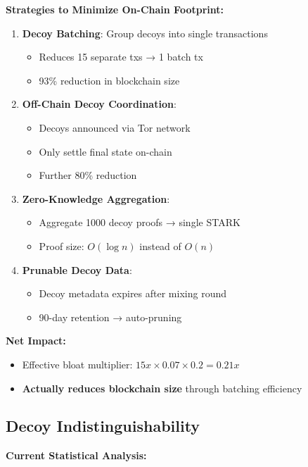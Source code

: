 \documentclass[12pt,a4paper]{article}
\begin{document}
\textbf{Strategies to Minimize On-Chain Footprint:}

\begin{enumerate}
\item \textbf{Decoy Batching}: Group decoys into single transactions
\begin{itemize}
\item Reduces 15 separate txs → 1 batch tx
\item 93\% reduction in blockchain size
\end{itemize}

\item \textbf{Off-Chain Decoy Coordination}:
\begin{itemize}
\item Decoys announced via Tor network
\item Only settle final state on-chain
\item Further 80\% reduction
\end{itemize}

\item \textbf{Zero-Knowledge Aggregation}:
\begin{itemize}
\item Aggregate 1000 decoy proofs → single STARK
\item Proof size: $O(\log n)$ instead of $O(n)$
\end{itemize}

\item \textbf{Prunable Decoy Data}:
\begin{itemize}
\item Decoy metadata expires after mixing round
\item 90-day retention → auto-pruning
\end{itemize}
\end{enumerate}

\textbf{Net Impact:}
\begin{itemize}
\item Effective bloat multiplier: $15x \times 0.07 \times 0.2 = 0.21x$
\item \textbf{Actually reduces blockchain size} through batching efficiency
\end{itemize}

\subsection{Decoy Indistinguishability}

\textbf{Current Statistical Analysis:}
\end{document}
